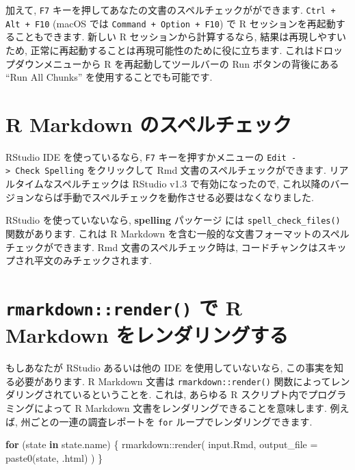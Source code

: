 \documentclass[
  11pt,
]{bxjsreport}
\newenvironment{Shaded}{\begin{snugshade}}{\end{snugshade}}
\newcommand{\AttributeTok}[1]{\textcolor[rgb]{0.77,0.63,0.00}{#1}}
\newcommand{\ControlFlowTok}[1]{\textcolor[rgb]{0.13,0.29,0.53}{\textbf{#1}}}
\newcommand{\FunctionTok}[1]{\textcolor[rgb]{0.00,0.00,0.00}{#1}}
\newcommand{\NormalTok}[1]{#1}
\newcommand{\SpecialCharTok}[1]{\textcolor[rgb]{0.00,0.00,0.00}{#1}}
\newcommand{\StringTok}[1]{\textcolor[rgb]{0.31,0.60,0.02}{#1}}
\begin{document}
加えて, \texttt{F7} キーを押してあなたの文書のスペルチェックがができます. \texttt{Ctrl + Alt + F10} (macOS では \texttt{Command + Option + F10}) で R セッションを再起動することもできます. 新しい R セッションから計算するなら, 結果は再現しやすいため, 正常に再起動することは再現可能性のために役に立ちます. これはドロップダウンメニューから R を再起動してツールバーの Run ボタンの背後にある ``Run All Chunks'' を使用することでも可能です.

\hypertarget{spell-check}{%
\section{R Markdown のスペルチェック}\label{spell-check}}

RStudio IDE を使っているなら, \texttt{F7} キーを押すかメニューの \texttt{Edit -\textgreater{}\ Check\ Spelling} をクリックして Rmd 文書のスペルチェックができます. リアルタイムなスペルチェックは RStudio v1.3 で有効になったので, これ以降のバージョンならば手動でスペルチェックを動作させる必要はなくなりました.

RStudio を使っていないなら, \textbf{spelling} パッケージ \autocite{R-spelling} には \texttt{spell\_check\_files()} 関数があります. これは R Markdown を含む一般的な文書フォーマットのスペルチェックができます. Rmd 文書のスペルチェック時は, コードチャンクはスキップされ平文のみチェックされます.

\hypertarget{rmarkdown-render}{%
\section{\texorpdfstring{\texttt{rmarkdown::render()} で R Markdown をレンダリングする}{rmarkdown::render() で R Markdown をレンダリングする}}\label{rmarkdown-render}}

もしあなたが RStudio あるいは他の IDE を使用していないなら, この事実を知る必要があります. R Markdown 文書は \texttt{rmarkdown::render()} 関数によってレンダリングされているということを. これは, あらゆる R スクリプト内でプログラミングによって R Markdown 文書をレンダリングできることを意味します. 例えば, 州ごとの一連の調査レポートを \texttt{for} ループでレンダリングできます.

\begin{Shaded}
\begin{Highlighting}[numbers=left,,]
\ControlFlowTok{for}\NormalTok{ (state }\ControlFlowTok{in}\NormalTok{ state.name) \{}
\NormalTok{  rmarkdown}\SpecialCharTok{::}\FunctionTok{render}\NormalTok{(}
    \StringTok{\textquotesingle{}input.Rmd\textquotesingle{}}\NormalTok{, }\AttributeTok{output\_file =} \FunctionTok{paste0}\NormalTok{(state, }\StringTok{\textquotesingle{}.html\textquotesingle{}}\NormalTok{)}
\NormalTok{  )}
\NormalTok{\}}
\end{Highlighting}
\end{Shaded}
\end{document}
